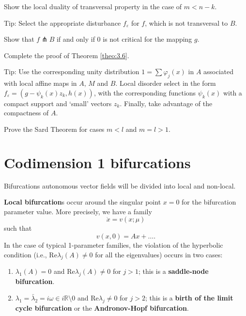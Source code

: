 \begin{task}
	Show the local duality of transversal property in the case of $m <n-k$.
	
	Tip: Select the appropriate disturbance $f_{\varepsilon }$ for $f$, which is not transversal to $B$.
\end{task}

\begin{task}
	Show that $f\pitchfork B$ if and only if 0 is not critical for the mapping $g$.
\end{task}

\begin{task}
	Complete the proof of Theorem \ref{theo:3.6}.
	
	Tip: Use the corresponding unity distribution $1=\sum \varphi _{j}(x)$ in $A$ associated with local affine maps in $A$, $M$ and $B$. Local disorder select in the form $f_{\varepsilon}=\left( g-\psi_{k}(x) z_{k}, h(x)\right)$, with the corresponding functions $\psi_{k}(x)$ with a compact support and `small' vectors $z_{k}$. Finally, take advantage of the compactness of $A$.
\end{task}

\begin{task}
	Prove the Sard Theorem for cases $m <l$ and $m = l> 1$.
\end{task}
\section{Codimension 1 bifurcations}\label{sec:3.3}

Bifurcations autonomous vector fields will be divided into local and non-local.

\textbf{Local bifurcation}s occur around the singular point $x = 0$ for the bifurcation parameter value. More precisely, we have a family
$$
\dot{x}=v(x;\mu )
$$%
such that
$$
v(x,0)=Ax+\ldots .
$$
In the case of typical 1-parameter families, the violation of the hyperbolic condition (i.e., $\textrm{Re}\lambda _{j}(A)\not=0$ for all the eigenvalues) occurs in two cases:
\begin{enumerate}
	\item $\lambda _{1}(A)=0$ and $\textrm{Re}\lambda _{j}(A)\not=0$ for $j>1$; this is a \textbf{saddle-node bifurcation}.
	\item $\lambda _{1}=\bar{\lambda}_{2}=i\omega \in i\mathbb{R}\setminus 0$
	and $\textrm{Re}\lambda _{j}\not=0$ for $j>2$; this is a \textbf{birth of the limit cycle bifurcation} or the \textbf{Andronov-Hopf bifurcation}.
\end{enumerate}

